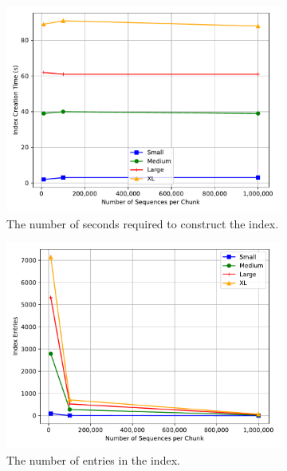 \begin{figure}%
\centering
    \begin{subfigure}[c]{.48\textwidth}
        \includegraphics[width=\linewidth]{figs/creation-time.pdf}
        \caption{The number of seconds required to construct the index.}
        \label{fig:creation}
    \end{subfigure}%
    \begin{subfigure}[c]{.48\textwidth}
        \includegraphics[width=\linewidth]{figs/index-entries.pdf}
        \caption{The number of entries in the index.}
        \label{fig:entries}
    \end{subfigure}%
    \hfill
    \begin{subfigure}[c]{.48\textwidth}

\end{subfigure}
\end{figure}
